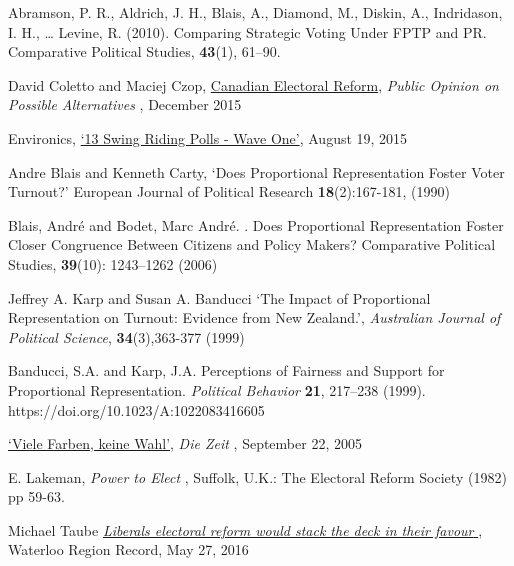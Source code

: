 
\begin{thebibliography}{99} %

Abramson, P. R., Aldrich, J. H., Blais, A., Diamond, M., Diskin, A., Indridason, I. H., … Levine, R. (2010). Comparing Strategic Voting Under FPTP and PR. Comparative Political Studies, \textbf{43}(1), 61–90. 

David Coletto and Maciej Czop,
{\color{blue} \href{https://d3n8a8pro7vhmx.cloudfront.net/broadbent/pages/4770/attachments/original/1448994262/Canadian_Electoral_Reform_-_Report.pdf?1448994262}{Canadian Electoral Reform}},
{\emph{Public Opinion on Possible Alternatives} }, December 2015

Environics,
{\color{blue} \href{http://www.votetogether.ca/pages/localpolling/}{`13 Swing Riding Polls - Wave One'}}, August 19, 2015

Andre Blais and Kenneth Carty, 
`Does Proportional Representation Foster Voter Turnout?'
European Journal of Political Research \textbf{18}(2):167-181, (1990)

Blais, Andr\'e and Bodet, Marc Andr\'e. . Does Proportional Representation Foster Closer Congruence Between Citizens and Policy Makers? Comparative Political Studies, \textbf{39}(10): 1243–1262 (2006)


Jeffrey A. Karp and Susan A. Banducci
`The Impact of Proportional Representation on Turnout: Evidence from New Zealand.',
\emph{Australian Journal of Political Science}, \textbf{34}(3),363-377 (1999)

Banducci, S.A. and Karp, J.A. Perceptions of Fairness and Support for Proportional Representation.
\emph{Political Behavior} \textbf{21}, 217–238 (1999). https://doi.org/10.1023/A:1022083416605

  
{\color{blue} \href{http://www.zeit.de/2005/39/Wahl\_paradox}{`Viele Farben, keine Wahl'}},
 { \emph{Die Zeit} }, September 22, 2005

E. Lakeman,
{ \emph{Power to Elect} }, Suffolk, U.K.: The Electoral Reform Society (1982) pp 59-63.

 Michael Taube
{\color{blue} \href{http://www.therecord.com/opinion-story/6692466-liberals-electoral-reform-would-stack-the-deck-in-their-favour/}{ \emph{Liberals electoral reform would stack the deck in their favour} } },
Waterloo Region Record, May 27, 2016 


\end{thebibliography}
